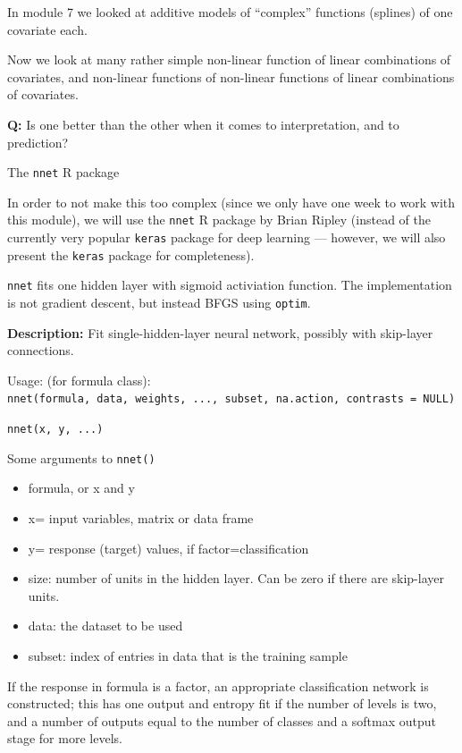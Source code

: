 \documentclass[10pt,ignorenonframetext,]{beamer}
\providecommand{\tightlist}{%
  \setlength{\itemsep}{0pt}\setlength{\parskip}{0pt}}
\begin{document}
\begin{frame}

In module 7 we looked at additive models of ``complex'' functions
(splines) of one covariate each.

Now we look at many rather simple non-linear function of linear
combinations of covariates, and non-linear functions of non-linear
functions of linear combinations of covariates.

\textbf{Q:} Is one better than the other when it comes to
interpretation, and to prediction?

\end{frame}

\begin{frame}[fragile]

\begin{block}{The \texttt{nnet} R package}

In order to not make this too complex (since we only have one week to
work with this module), we will use the \texttt{nnet} R package by Brian
Ripley (instead of the currently very popular \texttt{keras} package for
deep learning --- however, we will also present the \texttt{keras}
package for completeness).

\texttt{nnet} fits one hidden layer with sigmoid activiation function.
The implementation is not gradient descent, but instead BFGS using
\texttt{optim}.

\textbf{Description:} Fit single-hidden-layer neural network, possibly
with skip-layer connections.

Usage: (for formula class):
\texttt{nnet(formula,\ data,\ weights,\ ...,\ subset,\ na.action,\ contrasts\ =\ NULL)}

\texttt{nnet(x,\ y,\ ...)}

\end{block}

\end{frame}

\begin{frame}[fragile]

Some arguments to \texttt{nnet()}

\begin{itemize}
\tightlist
\item
  formula, or x and y
\item
  x= input variables, matrix or data frame
\item
  y= response (target) values, if factor=classification
\item
  size: number of units in the hidden layer. Can be zero if there are
  skip-layer units.
\item
  data: the dataset to be used
\item
  subset: index of entries in data that is the training sample
\end{itemize}

If the response in formula is a factor, an appropriate classification
network is constructed; this has one output and entropy fit if the
number of levels is two, and a number of outputs equal to the number of
classes and a softmax output stage for more levels.

\end{frame}
\end{document}
